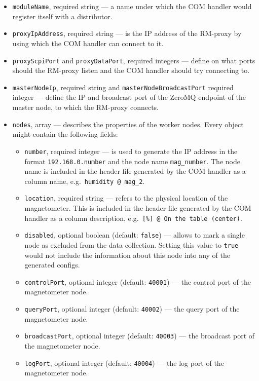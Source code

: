 \begin{itemize}
	\item \texttt{moduleName}, required string --- a name under which the COM handler would register itself with a distributor.
	\item \texttt{proxyIpAddress}, required string --- is the IP address of the RM-proxy by using which the COM handler can connect to it.
	\item \texttt{proxyScpiPort} and \texttt{proxyDataPort}, required integers --- define on what ports should the RM-proxy listen and the COM handler should try connecting to.
	\item \texttt{masterNodeIp}, required string and \texttt{masterNodeBroadcastPort} required integer --- define the IP and broadcast port of the ZeroMQ endpoint of the master node, to which the RM-proxy connects.
	\item{
		\texttt{nodes}, array --- describes the properties of the worker nodes. Every object might contain the following fields:
		\begin{itemize}
			\item \texttt{number}, required integer --- is used to generate the IP address in the format \texttt{192.168.0.number} and the node name \texttt{mag\_number}. The node name is included in the header file generated by the COM handler as a column name, e.g.\ \texttt{humidity @ mag\_2}.
			\item \texttt{location}, required string --- refers to the physical location of the magnetometer. This is included in the header file generated by the COM handler as a column description, e.g.\ \texttt{[\%] @ On the table (center)}.
			\item \texttt{disabled}, optional boolean (default: \texttt{false}) --- allows to mark a single node as excluded from the data collection. Setting this value to \texttt{true} would not include the information about this node into any of the generated configs.
			\item \texttt{controlPort}, optional integer (default: \texttt{40001}) --- the control port of the magnetometer node.
			\item \texttt{queryPort}, optional integer (default: \texttt{40002}) --- the query port of the magnetometer node.
			\item \texttt{broadcastPort}, optional integer (default: \texttt{40003}) --- the broadcast port of the magnetometer node.
			\item \texttt{logPort}, optional integer (default: \texttt{40004}) --- the log port of the magnetometer node.
		\end{itemize}
	}
\end{itemize}

